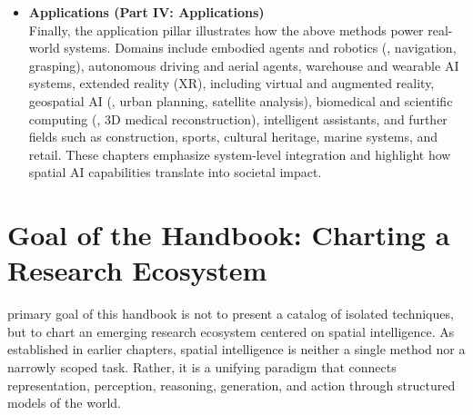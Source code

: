\begin{itemize}[leftmargin=2em,itemsep=0.35em]
    \item \textbf{Applications (Part IV: Applications)} \\
    Finally, the application pillar illustrates how the above methods power real-world systems. Domains include embodied agents and robotics (\eg, navigation, grasping), autonomous driving and aerial agents, warehouse and wearable AI systems, extended reality (XR), including virtual and augmented reality, geospatial AI (\eg, urban planning, satellite analysis), biomedical and scientific computing (\eg, 3D medical reconstruction), intelligent assistants, and further fields such as construction, sports, cultural heritage, marine systems, and retail. These chapters emphasize system-level integration and highlight how spatial AI capabilities translate into societal impact.
\end{itemize}













\section{Goal of the Handbook: Charting a Research Ecosystem}
\label{sec:p1-sec3-goal-of-the-handbook-charting-a-research-ecosystem}

 primary goal of this handbook is not to present a catalog of isolated techniques, but to chart an emerging research ecosystem centered on spatial intelligence.
As established in earlier chapters, spatial intelligence is neither a single method nor a narrowly scoped task.
Rather, it is a unifying paradigm that connects representation, perception, reasoning, generation, and action through structured models of the world.

